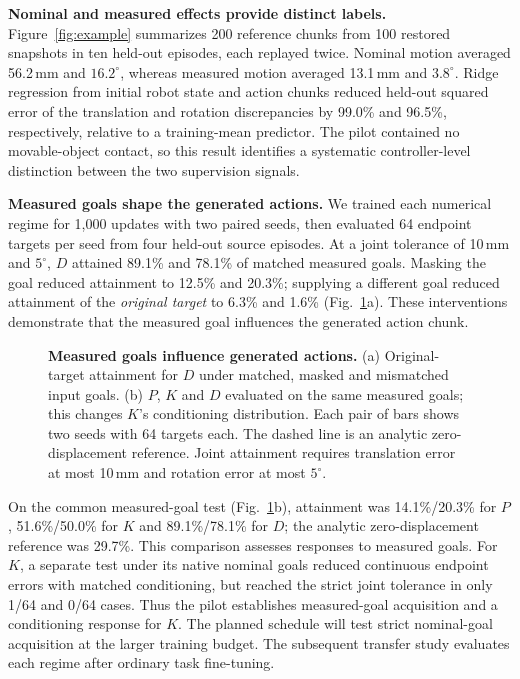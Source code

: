 \documentclass[conference]{IEEEtran}
\begin{document}
\textbf{Nominal and measured effects provide distinct labels.} Figure~\ref{fig:example} summarizes 200 reference chunks from 100 restored snapshots in ten held-out episodes, each replayed twice. Nominal motion averaged 56.2\,mm and $16.2^\circ$, whereas measured motion averaged 13.1\,mm and $3.8^\circ$. Ridge regression from initial robot state and action chunks reduced held-out squared error of the translation and rotation discrepancies by 99.0\% and 96.5\%, respectively, relative to a training-mean predictor. The pilot contained no movable-object contact, so this result identifies a systematic controller-level distinction between the two supervision signals.

\textbf{Measured goals shape the generated actions.} We trained each numerical regime for 1,000 updates with two paired seeds, then evaluated 64 endpoint targets per seed from four held-out source episodes. At a joint tolerance of 10\,mm and $5^\circ$, $D$ attained 89.1\% and 78.1\% of matched measured goals. Masking the goal reduced attainment to 12.5\% and 20.3\%; supplying a different goal reduced attainment of the \emph{original target} to 6.3\% and 1.6\% (Fig.~\ref{fig:acquisition}a). These interventions demonstrate that the measured goal influences the generated action chunk.

\begin{figure}[t]
\centering

\caption{\textbf{Measured goals influence generated actions.} (a) Original-target attainment for $D$ under matched, masked and mismatched input goals. (b) $P$, $K$ and $D$ evaluated on the same measured goals; this changes $K$'s conditioning distribution. Each pair of bars shows two seeds with 64 targets each. The dashed line is an analytic zero-displacement reference. Joint attainment requires translation error at most 10\,mm and rotation error at most $5^\circ$.}
\label{fig:acquisition}
\end{figure}

On the common measured-goal test (Fig.~\ref{fig:acquisition}b), attainment was 14.1\%/20.3\% for $P$, 51.6\%/50.0\% for $K$ and 89.1\%/78.1\% for $D$; the analytic zero-displacement reference was 29.7\%. This comparison assesses responses to measured goals. For $K$, a separate test under its native nominal goals reduced continuous endpoint errors with matched conditioning, but reached the strict joint tolerance in only 1/64 and 0/64 cases. Thus the pilot establishes measured-goal acquisition and a conditioning response for $K$. The planned schedule will test strict nominal-goal acquisition at the larger training budget. The subsequent transfer study evaluates each regime after ordinary task fine-tuning.
\end{document}
